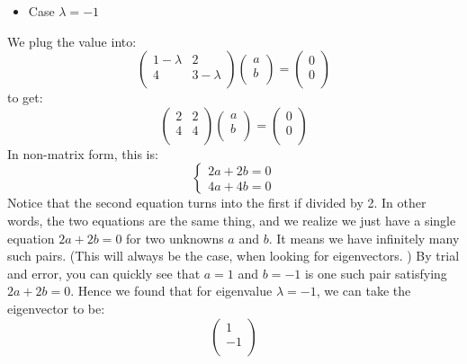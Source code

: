 \documentclass[12pt]{report}
\begin{document}
\begin{itemize}
\item  Case $\lambda = -1 $
\end{itemize}

We plug the value into:
$$\begin{pmatrix} 1- \lambda &2 \\ 4& 3- \lambda\\ \end{pmatrix} \begin{pmatrix} a \\ b\\ \end{pmatrix} =  \begin{pmatrix} 0 \\ 0\\ \end{pmatrix} $$
to get:
$$\begin{pmatrix} 2 & 2 \\ 4& 4 \\ \end{pmatrix} \begin{pmatrix} a \\ b\\ \end{pmatrix} =  \begin{pmatrix} 0 \\ 0\\ \end{pmatrix} $$
In non-matrix form, this is:
$$\begin{cases} 2a+2b =0  \\ 4a + 4b= 0 \end{cases}$$
Notice that the second equation turns into the first if divided by 2. In other words, the two equations are the same thing, and we realize we just have a single equation $2a+2b =0$ for two unknowns $a$ and $b$. It means we have infinitely many such pairs. (This will always be the case, when looking for eigenvectors. ) By trial and error, you can quickly see that $a=1$ and $b=-1$ is one such pair satisfying $2a+2b =0$. Hence we found that for eigenvalue $\lambda = -1 $, we can take the eigenvector to be:
$$\begin{pmatrix} 1 \\ -1 \\ \end{pmatrix} $$
\end{document}

